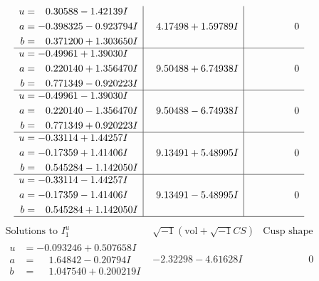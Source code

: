 \documentclass[1p]{elsarticle_modified}
\theoremstyle{definition}
\newcommand{\I}{\sqrt{-1}}
\begin{document}
$$\begin{array}{c|c|c}
\begin{aligned}
u &= \phantom{-}0.30588 - 1.42139 I \\
a &= -0.398325 - 0.923794 I \\
b &= \phantom{-}0.371200 + 1.303650 I\end{aligned}
 & \phantom{-}4.17498 + 1.59789 I & \phantom{-0.000000 } 0 \\ \hline\begin{aligned}
u &= -0.49961 + 1.39030 I \\
a &= \phantom{-}0.220140 + 1.356470 I \\
b &= \phantom{-}0.771349 - 0.920223 I\end{aligned}
 & \phantom{-}9.50488 + 6.74938 I & \phantom{-0.000000 } 0 \\ \hline\begin{aligned}
u &= -0.49961 - 1.39030 I \\
a &= \phantom{-}0.220140 - 1.356470 I \\
b &= \phantom{-}0.771349 + 0.920223 I\end{aligned}
 & \phantom{-}9.50488 - 6.74938 I & \phantom{-0.000000 } 0 \\ \hline\begin{aligned}
u &= -0.33114 + 1.44257 I \\
a &= -0.17359 + 1.41406 I \\
b &= \phantom{-}0.545284 - 1.142050 I\end{aligned}
 & \phantom{-}9.13491 + 5.48995 I & \phantom{-0.000000 } 0 \\ \hline\begin{aligned}
u &= -0.33114 - 1.44257 I \\
a &= -0.17359 - 1.41406 I \\
b &= \phantom{-}0.545284 + 1.142050 I\end{aligned}
 & \phantom{-}9.13491 - 5.48995 I & \phantom{-0.000000 } 0\\
 \hline 
 \end{array}$$\newpage$$\begin{array}{c|c|c}  
\text{Solutions to }I^u_{1}& \I (\text{vol} + \sqrt{-1}CS) & \text{Cusp shape}\\
 \hline 
\begin{aligned}
u &= -0.093246 + 0.507658 I \\
a &= \phantom{-}1.64842 - 0.20794 I \\
b &= \phantom{-}1.047540 + 0.200219 I\end{aligned}
 & -2.32298 - 4.61628 I & \phantom{-0.000000 } 0 \\ \hline\begin{aligned}

\end{aligned}
\end{array}$$
\end{document}
